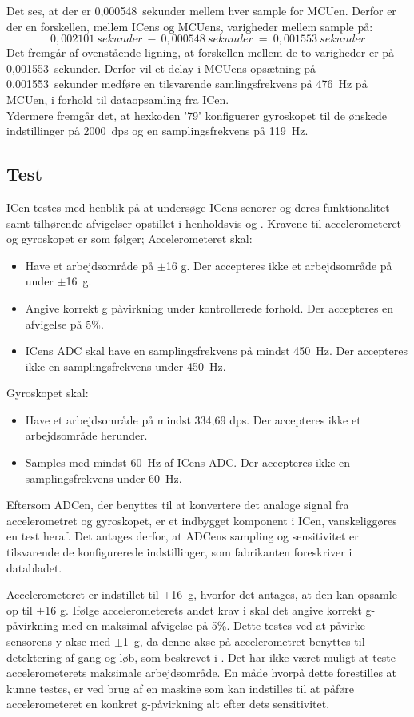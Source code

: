 Det ses, at der er 0,000548~sekunder mellem hver sample for MCUen. Derfor er der en forskellen, mellem ICens og MCUens, varigheder mellem sample på:
\begin{equation}
0,002101~sekunder~-~0,000548~sekunder~=~0,001553~sekunder
\end{equation} 
Det fremgår af ovenstående ligning, at forskellen mellem de to varigheder er på 0,001553~sekunder. Derfor vil et delay i MCUens opsætning på 0,001553~sekunder medføre en tilsvarende samlingsfrekvens på 476~Hz på MCUen, i forhold til dataopsamling fra ICen.
\\
Ydermere fremgår det, at hexkoden '79' konfiguerer gyroskopet til de ønskede indstillinger på 2000~dps og en samplingsfrekvens på 119~Hz. \citep{STMicroelectronics2016}

\subsection{Test}
ICen testes med henblik på at undersøge ICens senorer og deres funktionalitet samt tilhørende afvigelser opstillet i henholdsvis  og . Kravene til accelerometeret og gyroskopet er som følger;
Accelerometeret skal:
\begin{itemize}
	\item Have et arbejdsområde på $\pm$16 g. Der accepteres ikke et arbejdsområde på under $\pm$16~g.
	\item Angive korrekt g påvirkning under kontrollerede forhold. Der accepteres en afvigelse på 5\%.
	\item ICens ADC skal have en samplingsfrekvens på mindst 450~Hz. Der accepteres ikke en samplingsfrekvens under 450~Hz.
\end{itemize}
Gyroskopet skal:
\begin{itemize}
	\item Have et arbejdsområde på mindst 334,69 dps. Der accepteres ikke et arbejdsområde herunder.
	\item Samples med mindst 60~Hz af ICens ADC. Der accepteres ikke en samplingsfrekvens under 60~Hz.
\end{itemize}
Eftersom ADCen, der benyttes til at konvertere det analoge signal fra accelerometret og gyroskopet, er et indbygget komponent i ICen, vanskeliggøres en test heraf. Det antages derfor, at ADCens sampling og sensitivitet er tilsvarende de konfigurerede indstillinger, som fabrikanten foreskriver i databladet. \citep{STMicroelectronics2016}

Accelerometeret er indstillet til $\pm$16~g, hvorfor det antages, at den kan opsamle op til $\pm$16 g. Ifølge accelerometerets andet krav i  skal det angive korrekt g-påvirkning med en maksimal afvigelse på 5\%. Dette testes ved at påvirke sensorens y akse med $\pm$1~g, da denne akse på accelerometret benyttes til detektering af gang og løb, som beskrevet i . Det har ikke været muligt at teste accelerometerets maksimale arbejdsområde. En måde hvorpå dette forestilles at kunne testes, er ved brug af en maskine som kan indstilles til at påføre accelerometeret en konkret g-påvirkning alt efter dets sensitivitet. 

